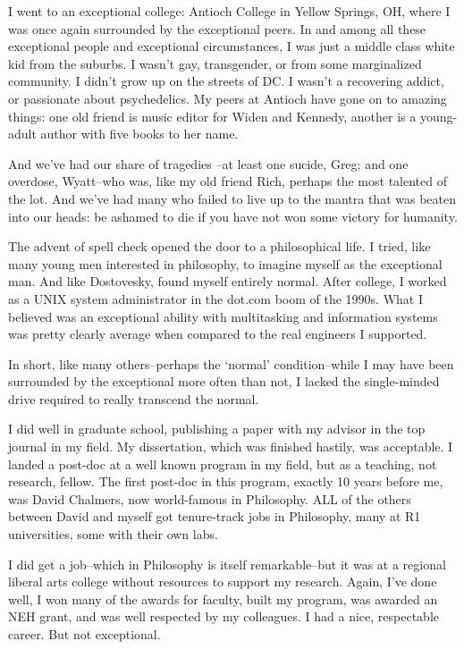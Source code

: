 I went to an exceptional college: Antioch College in Yellow Springs, OH, where I was once again surrounded by the exceptional peers. In and among all these exceptional people and exceptional circumstances, I was just a middle class white kid from the suburbs. I wasn't gay, transgender, or from some marginalized community. I didn't grow up on the streets of DC. I wasn't a recovering addict, or passionate about psychedelics. My peers at Antioch have gone on to amazing things: one old friend is music editor for Widen and Kennedy, another is a young-adult author with five books to her name. 

And we've had our share of tragedies --at least one sucide, Greg; and one overdose, Wyatt--who was, like my old friend Rich, perhaps the most talented of the lot. And we've had many who failed to live up to the mantra that was beaten into our heads: be ashamed to die if you have not won some victory for humanity.

The advent of spell check opened the door to a philosophical life. I tried, like many young men interested in philosophy, to imagine myself as the exceptional man. And like Dostovesky, found myself entirely normal. After college, I worked as a UNIX system administrator in the dot.com boom of the 1990s. What I believed was an exceptional ability with multitasking and information systems was pretty clearly average when compared to the real engineers I supported.

In short, like many others--perhaps the `normal' condition--while I may have been surrounded by the exceptional more often than not, I lacked the single-minded drive required to really transcend the normal.

I did well in graduate school, publishing a paper with my advisor in the top journal in my field. My dissertation, which was finished hastily, was acceptable. I landed a post-doc at a well known program in my field, but as a teaching, not research, fellow. The first post-doc in this program, exactly 10 years before me, was David Chalmers, now world-famous in Philosophy. ALL of the others between David and myself got tenure-track jobs in Philosophy, many at R1 universities, some with their own labs.

I did get a job--which in Philosophy is itself remarkable--but it was at a regional liberal arts college without resources to support my research. Again, I've done well, I won many of the awards for faculty, built my program, was awarded an NEH grant, and was well respected by my colleagues. I had a nice, respectable career. But not exceptional.

